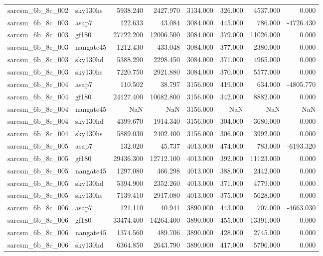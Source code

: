 \begin{tabular}{llrrrrrr}
sarcsm\_6b\_8c\_002 & sky130hs & 5938.240 & 2427.970 & 3134.000 & 326.000 & 4537.000 & 0.000 \\
sarcsm\_6b\_8c\_003 & asap7 & 122.633 & 43.084 & 3084.000 & 445.000 & 786.000 & -4726.430 \\
sarcsm\_6b\_8c\_003 & gf180 & 27722.200 & 12006.500 & 3084.000 & 379.000 & 11026.000 & 0.000 \\
sarcsm\_6b\_8c\_003 & nangate45 & 1212.430 & 433.048 & 3084.000 & 377.000 & 2380.000 & 0.000 \\
sarcsm\_6b\_8c\_003 & sky130hd & 5388.290 & 2298.450 & 3084.000 & 371.000 & 4965.000 & 0.000 \\
sarcsm\_6b\_8c\_003 & sky130hs & 7220.750 & 2921.880 & 3084.000 & 370.000 & 5577.000 & 0.000 \\
sarcsm\_6b\_8c\_004 & asap7 & 110.502 & 38.797 & 3156.000 & 419.000 & 634.000 & -4805.770 \\
sarcsm\_6b\_8c\_004 & gf180 & 24127.400 & 10682.800 & 3156.000 & 342.000 & 8882.000 & 0.000 \\
sarcsm\_6b\_8c\_004 & nangate45 & NaN & NaN & 3156.000 & NaN & NaN & NaN \\
sarcsm\_6b\_8c\_004 & sky130hd & 4399.670 & 1914.340 & 3156.000 & 304.000 & 3680.000 & 0.000 \\
sarcsm\_6b\_8c\_004 & sky130hs & 5889.030 & 2402.400 & 3156.000 & 306.000 & 3992.000 & 0.000 \\
sarcsm\_6b\_8c\_005 & asap7 & 132.020 & 45.737 & 4013.000 & 474.000 & 783.000 & -6193.320 \\
sarcsm\_6b\_8c\_005 & gf180 & 29436.300 & 12712.100 & 4013.000 & 392.000 & 11123.000 & 0.000 \\
sarcsm\_6b\_8c\_005 & nangate45 & 1297.080 & 466.298 & 4013.000 & 388.000 & 2442.000 & 0.000 \\
sarcsm\_6b\_8c\_005 & sky130hd & 5394.900 & 2352.260 & 4013.000 & 371.000 & 4779.000 & 0.000 \\
sarcsm\_6b\_8c\_005 & sky130hs & 7139.410 & 2917.080 & 4013.000 & 375.000 & 5628.000 & 0.000 \\
sarcsm\_6b\_8c\_006 & asap7 & 121.110 & 40.941 & 3890.000 & 443.000 & 707.000 & -4663.030 \\
sarcsm\_6b\_8c\_006 & gf180 & 33474.400 & 14264.400 & 3890.000 & 455.000 & 13391.000 & 0.000 \\
sarcsm\_6b\_8c\_006 & nangate45 & 1374.560 & 489.706 & 3890.000 & 428.000 & 2745.000 & 0.000 \\
sarcsm\_6b\_8c\_006 & sky130hd & 6364.850 & 2643.790 & 3890.000 & 417.000 & 5796.000 & 0.000 \\

\end{tabular}
